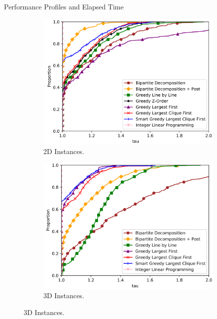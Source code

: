 \begin{frame}{Performance Profiles and Elapsed Time}
  \begin{figure}
    \begin{subfigure}{0.4\textwidth}
      \includegraphics[width=\linewidth]{figures/2d_results_ilp.png}
      \caption{2D Instances. \footnotemark[1]}
    \end{subfigure}
    \hfill
    \begin{subfigure}{0.4\textwidth}
      \includegraphics[width=\linewidth]{figures/3d_results_ilp.png}
      \caption{3D Instances. \footnotemark[1]}
    \end{subfigure}

    \medskip


\end{figure}
\end{frame}
